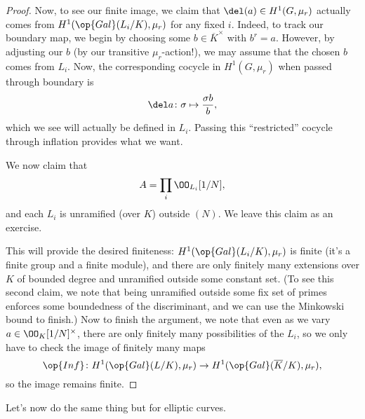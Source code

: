 \documentclass[../notes.tex]{subfiles}
\begin{document}
\begin{proof}
	Now, to see our finite image, we claim that $\del(a)\in H^1(G,\mu_r)$ actually comes from $H^1(\op{Gal}(L_i/K),\mu_r)$ for any fixed $i$. Indeed, to track our boundary map, we begin by choosing some $b\in\overline K^\times$ with $b^r=a$. However, by adjusting our $b$ (by our transitive $\mu_r$-action!), we may assume that the chosen $b$ comes from $L_i$. Now, the corresponding cocycle in $H^1(G,\mu_r)$ when passed through boundary is
	\[\del a\colon\sigma\mapsto\frac{\sigma b}b,\]
	which we see will actually be defined in $L_i$. Passing this ``restricted'' cocycle through inflation provides what we want.

	We now claim that
	\[A=\prod_i\OO_{L_i}[1/N],\]
	and each $L_i$ is unramified (over $K$) outside $(N)$. We leave this claim as an exercise.
	
	This will provide the desired finiteness: $H^1(\op{Gal}(L_i/K),\mu_r)$ is finite (it's a finite group and a finite module), and there are only finitely many extensions over $K$ of bounded degree and unramified outside some constant set. (To see this second claim, we note that being unramified outside some fix set of primes enforces some boundedness of the discriminant, and we can use the Minkowski bound to finish.) Now to finish the argument, we note that even as we vary $a\in\OO_K[1/N]^\times$, there are only finitely many possibilities of the $L_i$, so we only have to check the image of finitely many maps
	\[\op{Inf}\colon H^1(\op{Gal}(L/K),\mu_r)\to H^1(\op{Gal}(\overline K/K),\mu_r),\]
	so the image remains finite.
\end{proof}
Let's now do the same thing but for elliptic curves.
\weakmwthm*
\end{document}
